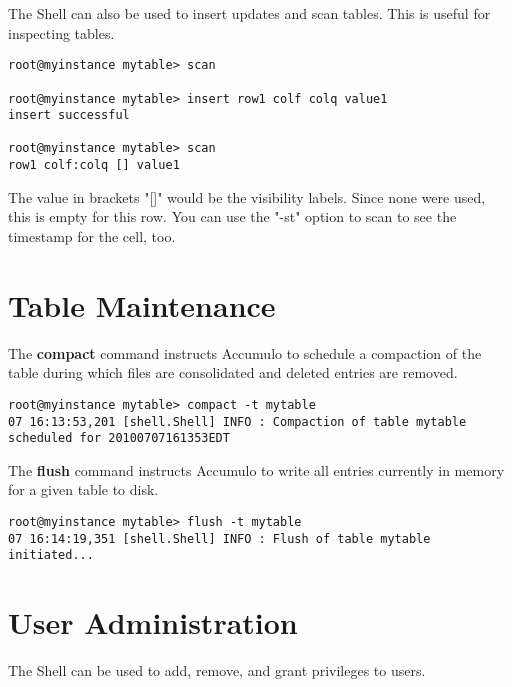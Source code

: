 The Shell can also be used to insert updates and scan tables. This is useful for
inspecting tables.

\small
\begin{verbatim}
root@myinstance mytable> scan

root@myinstance mytable> insert row1 colf colq value1
insert successful

root@myinstance mytable> scan
row1 colf:colq [] value1
\end{verbatim}
\normalsize

The value in brackets "[]" would be the visibility labels. Since none were used, this is empty for this row.
You can use the "-st" option to scan to see the timestamp for the cell, too.

\section{Table Maintenance}

The \textbf{compact} command instructs Accumulo to schedule a compaction of the table during which
files are consolidated and deleted entries are removed.

\small
\begin{verbatim}
root@myinstance mytable> compact -t mytable
07 16:13:53,201 [shell.Shell] INFO : Compaction of table mytable
scheduled for 20100707161353EDT
\end{verbatim}
\normalsize

The \textbf{flush} command instructs Accumulo to write all entries currently in memory for a given table
to disk.

\small
\begin{verbatim}
root@myinstance mytable> flush -t mytable
07 16:14:19,351 [shell.Shell] INFO : Flush of table mytable
initiated...
\end{verbatim}
\normalsize

\section{User Administration}

The Shell can be used to add, remove, and grant privileges to users.

